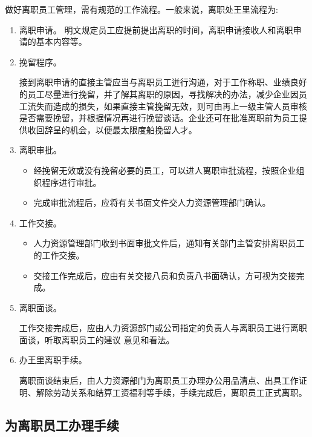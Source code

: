     做好离职员工管理，需有规范的工作流程。一般来说，离职处王里流程为:
    \begin{enumerate}
        \item 离职申请。
        明文规定员工应提前提出离职的时间，离职申请接收人和离职申请的基本内容等。

        \item 挽留程序。

        接到离职申请的直接主管应当与离职员工迸行沟通，对于工作称职、业绩良好的员工尽量进行挽留，并了解其离职的原因，寻找解决的办法，减少企业因员工流失而造成的损失，如果直接主管挽留无效，则可由再上一级主管人员审核是否需要挽留，并根据情况再进行挽留谈话。企业还可在批准离职前为员工提供收回辞呈的机会，以便最太限度舶挽留人才。

        \item 离职审批。
            \begin{itemize}
                \item 经挽留无效或没有挽留必要的员工，可以进人离职审批流程，按照企业组织程序进行审批。

                \item 完成审批流程后，应将有关书面文件交人力资源管理部门确认。
            \end{itemize}

        \item 工作交接。

            \begin{itemize}
                \item 人力资源管理部门收到书面审批文件后，通知有关部门主管安排离职员工的工作交接。

                \item 交接工作完成后，应由有关交接八员和负责八书面确认，方可视为交接完成。
            \end{itemize}

        \item 离职面谈。

        工作交接完成后，应由人力资源部门或公司指定的负责人与离职员工进行离职面谈，听取离职员工的建议 意见和看法。

        \item 办王里离职手续。

        离职面谈结束后，由人力资源部门为离职员工办理办公用品清点、出具工作证明、解除劳动关系和结算工资福利等手续，手续完成后，离职员工正式离职。

    \end{enumerate}

\subsection {为离职员工办理手续}

